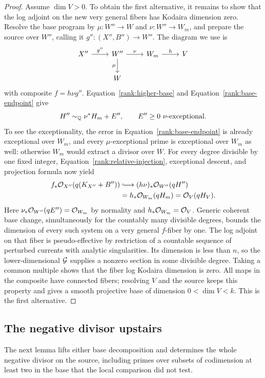\begin{proof}
Assume \(\dim V>0\).  To obtain the first alternative, it remains to show
that the log adjoint on the new very general fibers has Kodaira dimension
zero.  Resolve the base program by
\(\mu:W''\to W\) and \(\nu:W''\to W_m\), and prepare the source
over \(W''\), calling it \(g'':(X'',B'')\to W''\).  The diagram
we use is
\[
\begin{tikzcd}
 X'' \arrow[r,"g''"] & W'' \arrow[r,"\nu"] \arrow[d,"\mu"'] &
 W_m \arrow[r,"h"] & V\\
 & W
\end{tikzcd}
\]
with composite \(f= h\nu g''\).
Equation~\eqref{rank:higher-base} and
Equation~\eqref{rank:base-endpoint} give
\[
                  H''\sim_{\mathbb Q}\nu^*H_m+E'',
                  \qquad E''\geq0\ \text{\(\nu\)-exceptional}.
\]
To see the exceptionality, the error in
Equation~\eqref{rank:base-endpoint} is already exceptional over
\(W_m\), and every \(\mu\)-exceptional prime is exceptional
over \(W_m\) as well: otherwise \(W_m\) would extract a divisor
over \(W\).
For every degree divisible by one fixed integer,
Equation~\eqref{rank:relative-injection}, exceptional descent,
and projection formula now yield
\begin{align*}
 f_*\OO_{X''}(q(K_{X''}+B''))
 &\lhook\joinrel\longrightarrow
       (h\nu)_*\OO_{W''}(qH'')\\
 &=h_*\OO_{W_m}(qH_m)=\OO_V(qH_V).
\end{align*}
Here \(\nu_*\mathcal O_{W''}(qE'')=\mathcal O_{W_m}\) by normality and
\(h_*\mathcal O_{W_m}=\mathcal O_V\).  Generic coherent base change,
simultaneously for the countably many divisible degrees, bounds
the dimension of every such system on a very general \(f\)-fiber
by one.  The log adjoint on that fiber is pseudo-effective by
restriction of a countable sequence of perturbed currents with
analytic singularities.  Its dimension is less than \(n\), so
the lower-dimensional \(\mathcal G\) supplies a nonzero section in
some divisible degree.  Taking a common multiple shows that the
fiber log Kodaira dimension is zero.  All maps in the composite
have connected fibers; resolving \(V\) and the source keeps this
property and gives a smooth projective base of dimension
\(0<\dim V<k\).  This is the first alternative.
\end{proof}

\subsection{The negative divisor upstairs}

The next lemma lifts either base decomposition and determines the whole
negative divisor on the source, including primes over subsets of
codimension at least two in the base that the local comparison did not test.

